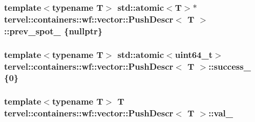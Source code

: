 \subsubsection[{prev\+\_\+spot\+\_\+}]{\setlength{\rightskip}{0pt plus 5cm}template$<$typename T$>$ std\+::atomic$<$T$>$$\ast$ {\bf tervel\+::containers\+::wf\+::vector\+::\+Push\+Descr}$<$ T $>$\+::prev\+\_\+spot\+\_\+ \{nullptr\}\hspace{0.3cm}{\ttfamily [private]}}\label{classtervel_1_1containers_1_1wf_1_1vector_1_1_push_descr_a7ce9de884957d0e200233e71e59f417f}
\hypertarget{classtervel_1_1containers_1_1wf_1_1vector_1_1_push_descr_a9aceab6795bc84efed74cad6d537e5e9}{}
\subsubsection[{success\+\_\+}]{\setlength{\rightskip}{0pt plus 5cm}template$<$typename T$>$ std\+::atomic$<$uint64\+\_\+t$>$ {\bf tervel\+::containers\+::wf\+::vector\+::\+Push\+Descr}$<$ T $>$\+::success\+\_\+ \{0\}\hspace{0.3cm}{\ttfamily [private]}}\label{classtervel_1_1containers_1_1wf_1_1vector_1_1_push_descr_a9aceab6795bc84efed74cad6d537e5e9}
\hypertarget{classtervel_1_1containers_1_1wf_1_1vector_1_1_push_descr_af9bcca18a4b5fd5cb92787655322bb32}{}
\subsubsection[{val\+\_\+}]{\setlength{\rightskip}{0pt plus 5cm}template$<$typename T$>$ T {\bf tervel\+::containers\+::wf\+::vector\+::\+Push\+Descr}$<$ T $>$\+::val\+\_\+\hspace{0.3cm}{\ttfamily [private]}}\label{classtervel_1_1containers_1_1wf_1_1vector_1_1_push_descr_af9bcca18a4b5fd5cb92787655322bb32}
\hypertarget{classtervel_1_1containers_1_1wf_1_1vector_1_1_push_descr_a4435889c7578aac40dd4355523b52238}{}
